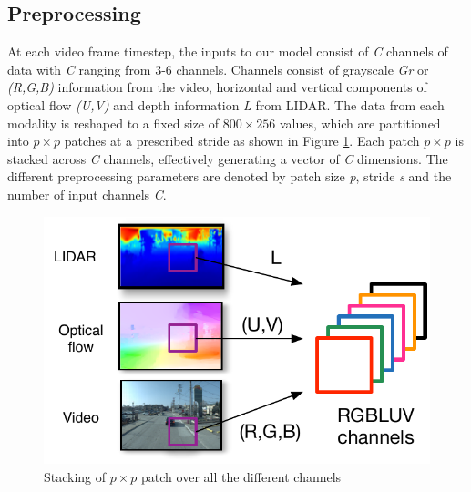 \documentclass{article}
\begin{document}

\subsection{Preprocessing} %
\label{sub:preprocessing}
At each video frame timestep, the inputs to our model consist of \emph{C} channels of data with \emph{C} ranging from 3-6 channels. Channels consist of grayscale \emph{Gr} or \emph{(R,G,B)} information from the video, horizontal and vertical components of optical flow \emph{(U,V)} and depth information \emph{L} from LIDAR. The data from each modality is reshaped to a fixed size of $800\times256$ values, which are partitioned into $p\times p$ patches at a prescribed stride as shown in Figure \ref{fig:ImageChStride}. Each patch $p\times p$ is stacked across \emph{C} channels, effectively generating a vector of \emph{C} dimensions. The different preprocessing parameters are denoted by patch size \emph{p}, stride \emph{s} and the number of input channels \emph{C}.

\begin{figure}[htbp]
    \centering
        \includegraphics[scale=0.65]{Figures/ImagePatchChannel.pdf}
    \caption{Stacking of $p\times p$ patch over all the different channels}
    \label{fig:ImageChStride}
\end{figure}
\end{document}
